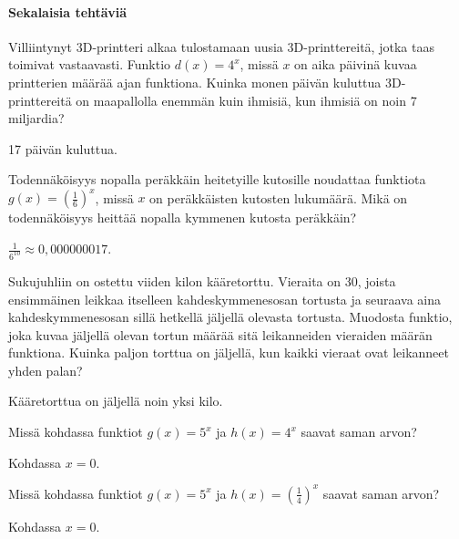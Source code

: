 \begin{tehtavasivu}
\paragraph*{Sekalaisia tehtäviä}

\begin{tehtava}
Villiintynyt 3D-printteri alkaa tulostamaan uusia 3D-printtereitä, jotka taas toimivat vastaavasti. Funktio $ d(x)=4^{x} $, missä $ x $ on aika päivinä kuvaa printterien määrää ajan funktiona. Kuinka monen päivän kuluttua 3D-printtereitä on maapallolla enemmän kuin ihmisiä, kun ihmisiä on noin 7 miljardia?
\begin{vastaus}
17 päivän kuluttua.
\end{vastaus}
\end{tehtava}

\begin{tehtava}
Todennäköisyys nopalla peräkkäin heitetyille kutosille noudattaa funktiota 
$ g(x)=(\frac{1}{6})^{x} $, missä $ x $ on peräkkäisten kutosten lukumäärä.
Mikä on todennäköisyys heittää nopalla kymmenen kutosta peräkkäin?
\begin{vastaus}
$ \frac{1}{6^{10}}\approx0,000000017 $.
\end{vastaus}
\end{tehtava}

\begin{tehtava}
Sukujuhliin on ostettu viiden kilon kääretorttu. Vieraita on 30, joista ensimmäinen leikkaa itselleen kahdeskymmenesosan tortusta ja seuraava aina kahdeskymmenesosan sillä hetkellä jäljellä olevasta tortusta. Muodosta funktio, joka kuvaa jäljellä olevan tortun määrää sitä leikanneiden vieraiden määrän funktiona. Kuinka paljon torttua on jäljellä, kun kaikki vieraat ovat leikanneet yhden palan?
\begin{vastaus}
Kääretorttua on jäljellä noin yksi kilo.
\end{vastaus}
\end{tehtava}

\begin{tehtava}
Missä kohdassa funktiot $ g(x)=5^{x} $ ja $ h(x)=4^{x} $ saavat saman arvon?
\begin{vastaus}
Kohdassa $x = 0$.
\end{vastaus}
\end{tehtava}

\begin{tehtava}
Missä kohdassa funktiot $ g(x)=5^{x} $ ja $ h(x)=(\frac{1}{4})^{x} $ saavat saman arvon?
\begin{vastaus}
Kohdassa $x = 0$.
\end{vastaus}
\end{tehtava}


\end{tehtavasivu}
